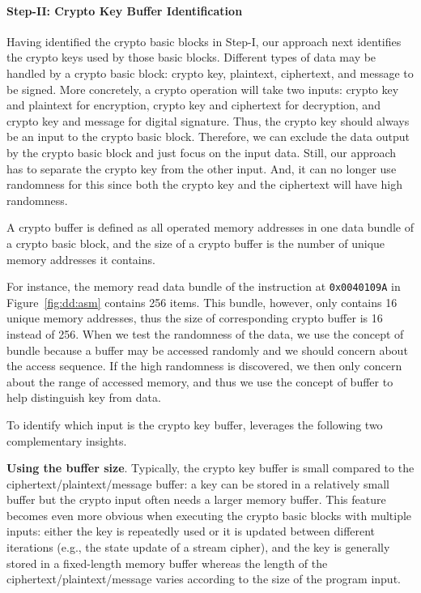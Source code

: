 {\paragraph{Step-II: Crypto Key Buffer Identification}
Having identified the crypto basic blocks in Step-I, our approach next identifies the crypto keys used by those basic blocks. 
Different types of data may be handled by a crypto basic block: crypto key, plaintext, ciphertext, and message to be signed. 
More concretely, a crypto operation will take two inputs: 
crypto key and plaintext for encryption, 
crypto key and ciphertext for decryption, and 
crypto key and message for digital signature. 
Thus, the crypto key should always be an input to the crypto basic block. 
Therefore, we can exclude the data output by the crypto basic block and just focus on the input data. 
Still, our approach has to separate the crypto key from the other input. 
And, it  can no longer use randomness for this since both the crypto key and the ciphertext will have high randomness.

\begin{Definition}
A crypto buffer is defined as all operated memory addresses in one data bundle of a crypto basic block,
and the size of a crypto buffer is the number of unique memory addresses it contains. 
\end{Definition}

{For instance, the memory read data bundle of the  instruction at \texttt{0x0040109A} in Figure~\ref{fig:dd:asm} contains 256 items.
This bundle, however, only contains 16 unique memory addresses, thus the size of corresponding crypto buffer is 16 instead of 256.
When we test the randomness of the data, we use the concept of bundle because a buffer may be accessed randomly and we should concern about the access sequence.
If the high randomness is discovered, we then only concern about the range of accessed memory,
	and thus we use the concept of buffer to help distinguish key from data.
}

To identify which input is the crypto key buffer, \sysname leverages the following two complementary insights.

\begin{compactitem}
\item \textbf{Using the buffer size}. 
Typically, the crypto key buffer is small compared to the ciphertext/plaintext/message buffer: a key can be stored in a relatively small buffer but the crypto input often needs a larger memory buffer. 
This feature becomes even more obvious when executing the crypto basic blocks with multiple inputs: either the key is repeatedly used or it is updated between different iterations (e.g., the state update of a stream cipher), and the key is generally stored in a fixed-length memory buffer whereas the length of the ciphertext/plaintext/message varies according to the size of the program input.


\end{compactitem}}
